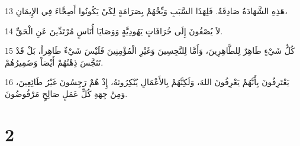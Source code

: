 \par 13 هَذِهِ الشَّهَادَةُ صَادِقَةٌ. فَلِهَذَا السَّبَبِ وَبِّخْهُمْ بِصَرَامَةٍ لِكَيْ يَكُونُوا أَصِحَّاءَ فِي الإِيمَانِ،
\par 14 لاَ يُصْغُونَ إِلَى خُرَافَاتٍ يَهُودِيَّةٍ وَوَصَايَا أُنَاسٍ مُرْتَدِّينَ عَنِ الْحَقِّ.
\par 15 كُلُّ شَيْءٍ طَاهِرٌ لِلطَّاهِرِينَ، وَأَمَّا لِلنَّجِسِينَ وَغَيْرِ الْمُؤْمِنِينَ فَلَيْسَ شَيْءٌ طَاهِراً، بَلْ قَدْ تَنَجَّسَ ذِهْنُهُمْ أَيْضاً وَضَمِيرُهُمْ.
\par 16 يَعْتَرِفُونَ بِأَنَّهُمْ يَعْرِفُونَ اللهَ، وَلَكِنَّهُمْ بِالأَعْمَالِ يُنْكِرُونَهُ، إِذْ هُمْ رَجِسُونَ غَيْرُ طَائِعِينَ، وَمِنْ جِهَةِ كُلِّ عَمَلٍ صَالِحٍ مَرْفُوضُونَ.

\chapter{2}

